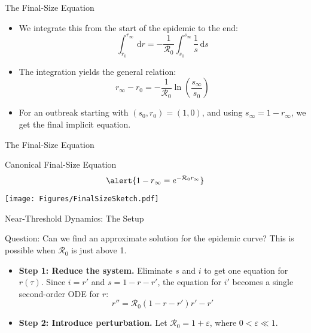 \documentclass[14pt,aspectratio=169]{beamer}
\newcommand{\dd}{\,\mathrm{d}}
\newcommand{\RR}{\mathcal{R}_0}
\begin{document}
\begin{frame}{The Final-Size Equation}
    \begin{itemize}
        \item We integrate this from the start of the epidemic to the end:
        \[ \int_{r_0}^{r_\infty} \dd r = -\frac{1}{\RR} \int_{s_0}^{s_\infty} \frac{1}{s} \dd s \]
        \item The integration yields the general relation: 
        \[r_\infty - r_0 = -\frac{1}{\RR} \ln\left(\frac{s_\infty}{s_0}\right)\]
    
        \item For an outbreak starting with $(s_0, r_0)=(1, 0)$, and using $s_\infty = 1 - r_\infty$, we get the final implicit equation.
    \end{itemize}
\end{frame}
\begin{frame}{The Final-Size Equation}
    \begin{alertblock}{Canonical Final-Size Equation}
        \[ \alert{1 - r_\infty = e^{-\RR r_\infty}} \]
    \end{alertblock}
    \centering
    \texttt{[image: Figures/FinalSizeSketch.pdf]}
\end{frame}


\begin{frame}{Near-Threshold Dynamics: The Setup}
    \begin{block}{Question: Can we find an approximate solution for the epidemic curve?}
        This is possible when $\RR$ is just above 1.
    \end{block}
    \begin{itemize}
        \item \textbf{Step 1: Reduce the system.} Eliminate $s$ and $i$ to get one equation for $r(\tau)$. Since $i=r'$ and $s=1-r-r'$, the equation for $i'$ becomes a single second-order ODE for $r$:
          \[ r'' = \RR(1-r-r')r' - r' \]
    \end{itemize}
    \pause
    \begin{itemize}
        \item \textbf{Step 2: Introduce perturbation.} Let $\RR = 1+\varepsilon$, where $0 < \varepsilon \ll 1$.
    \end{itemize}
\end{frame}
\end{document}
